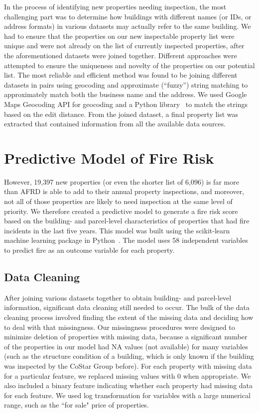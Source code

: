 \documentclass{sig-alternate-05-2015}
\begin{document}
{In the process of identifying new properties needing inspection, the most challenging part was 
to determine how buildings with different names (or IDs, or address formats) in various datasets may actually refer to the same building. We had to ensure that the properties on our new inspectable property list were unique and were not already on the list of currently inspected properties, after the aforementioned datasets were joined together. Different approaches were attempted to ensure the uniqueness and novelty of the properties on our potential list. The most reliable and efficient method was found to be joining different datasets in pairs using geocoding and approximate (``fuzzy'') string matching to approximately match both the business name and the address. We used Google Maps Geocoding API for geocoding and a Python library~\cite{strmat} to match the strings based on the edit distance. From the joined dataset, a final property list was extracted that contained information from all the available data sources.

\section{Predictive Model of Fire Risk}
However, 19,397 new properties (or even the shorter list of 6,096) is far more than AFRD is able to add to their annual property inspections, and moreover, not all of those properties are likely to need inspection at the same level of priority. We therefore created a predictive model to generate a fire risk score based on the building- and parcel-level characteristics of properties that had fire incidents in the last five years. This model was built using the scikit-learn machine learning package in Python~\cite{scikit-learn}. The model uses 58 independent variables to predict fire as an outcome variable for each property. 

\subsection{Data Cleaning}
After joining various datasets together to obtain building- and parcel-level information, significant data cleaning still needed to occur. The bulk of the data cleaning process involved finding the extent of the missing data and deciding how to deal with that missingness. Our missingness procedures were designed to minimize deletion of properties with missing data, because a significant number of the properties in our model had NA values (not available) for many variables (such as the structure condition of a building, which is only known if the building was inspected by the CoStar Group before). For each property with missing data for a particular feature, we replaced missing values with 0 when appropriate. We also included a binary feature indicating whether each property had missing data for each feature. We used log transformation for variables with a large numerical range, such as the ``for sale" price of properties.

}
\end{document}
